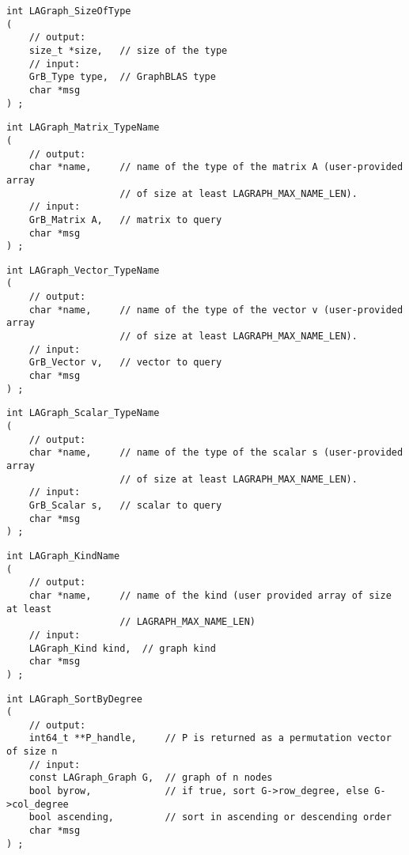 \begin{verbatim}
int LAGraph_SizeOfType
(
    // output:
    size_t *size,   // size of the type
    // input:
    GrB_Type type,  // GraphBLAS type
    char *msg
) ;
\end{verbatim}




\begin{verbatim}
int LAGraph_Matrix_TypeName
(
    // output:
    char *name,     // name of the type of the matrix A (user-provided array
                    // of size at least LAGRAPH_MAX_NAME_LEN).
    // input:
    GrB_Matrix A,   // matrix to query
    char *msg
) ;
\end{verbatim}




\begin{verbatim}
int LAGraph_Vector_TypeName
(
    // output:
    char *name,     // name of the type of the vector v (user-provided array
                    // of size at least LAGRAPH_MAX_NAME_LEN).
    // input:
    GrB_Vector v,   // vector to query
    char *msg
) ;
\end{verbatim}




\begin{verbatim}
int LAGraph_Scalar_TypeName
(
    // output:
    char *name,     // name of the type of the scalar s (user-provided array
                    // of size at least LAGRAPH_MAX_NAME_LEN).
    // input:
    GrB_Scalar s,   // scalar to query
    char *msg
) ;
\end{verbatim}




\begin{verbatim}
int LAGraph_KindName
(
    // output:
    char *name,     // name of the kind (user provided array of size at least
                    // LAGRAPH_MAX_NAME_LEN)
    // input:
    LAGraph_Kind kind,  // graph kind
    char *msg
) ;
\end{verbatim}




\begin{verbatim}
int LAGraph_SortByDegree
(
    // output:
    int64_t **P_handle,     // P is returned as a permutation vector of size n
    // input:
    const LAGraph_Graph G,  // graph of n nodes
    bool byrow,             // if true, sort G->row_degree, else G->col_degree
    bool ascending,         // sort in ascending or descending order
    char *msg
) ;
\end{verbatim}




